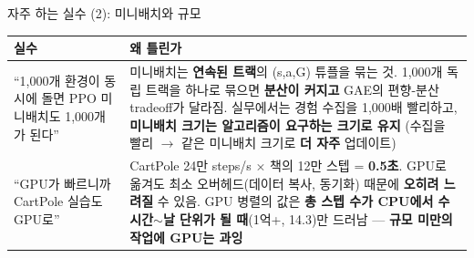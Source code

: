 \begin{frame}{자주 하는 실수 (2): 미니배치와 규모}
  \small
  \begin{tabular}{@{}p{4.6cm}p{9.4cm}@{}}
    \toprule
    실수 & 왜 틀린가 \\
    \midrule
    ``1,000개 환경이 동시에 돌면 PPO 미니배치도 1,000개가
      된다'' & 미니배치는 \textbf{연속된 트랙}의 (s,a,G) 튜플을
      묶는 것. 1,000개 독립 트랙을 하나로 묶으면 \textbf{분산이
      커지고} GAE의 편향-분산 tradeoff가 달라짐. 실무에서는
      경험 수집을 1,000배 빨리하고, \textbf{미니배치 크기는
      알고리즘이 요구하는 크기로 유지} (수집을 빨리 $\to$
      같은 미니배치 크기로 \textbf{더 자주} 업데이트) \\
    ``GPU가 빠르니까 CartPole 실습도 GPU로'' & CartPole 24만
      steps/s $\times$ 책의 12만 스텝 = \textbf{0.5초}. GPU로
      옮겨도 최소 오버헤드(데이터 복사, 동기화) 때문에 \textbf{오히려
      느려질} 수 있음. GPU 병렬의 값은 \textbf{총 스텝 수가 CPU에서
      수 시간$\sim$날 단위가 될 때}(1억+, 14.3)만 드러남 ---
      \textbf{규모 미만의 작업에 GPU는 과잉} \\
    \bottomrule
  \end{tabular}
\end{frame}
